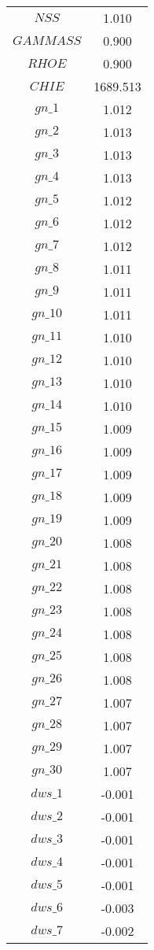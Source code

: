 \begin{center}
\begin{longtable}{cc}
$NSS$ 	 & 	 1.010 \\
$GAMMASS$ 	 & 	 0.900 \\
$RHOE$ 	 & 	 0.900 \\
$CHIE$ 	 & 	 1689.513 \\
$gn\_1$ 	 & 	 1.012 \\
$gn\_2$ 	 & 	 1.013 \\
$gn\_3$ 	 & 	 1.013 \\
$gn\_4$ 	 & 	 1.013 \\
$gn\_5$ 	 & 	 1.012 \\
$gn\_6$ 	 & 	 1.012 \\
$gn\_7$ 	 & 	 1.012 \\
$gn\_8$ 	 & 	 1.011 \\
$gn\_9$ 	 & 	 1.011 \\
$gn\_10$ 	 & 	 1.011 \\
$gn\_11$ 	 & 	 1.010 \\
$gn\_12$ 	 & 	 1.010 \\
$gn\_13$ 	 & 	 1.010 \\
$gn\_14$ 	 & 	 1.010 \\
$gn\_15$ 	 & 	 1.009 \\
$gn\_16$ 	 & 	 1.009 \\
$gn\_17$ 	 & 	 1.009 \\
$gn\_18$ 	 & 	 1.009 \\
$gn\_19$ 	 & 	 1.009 \\
$gn\_20$ 	 & 	 1.008 \\
$gn\_21$ 	 & 	 1.008 \\
$gn\_22$ 	 & 	 1.008 \\
$gn\_23$ 	 & 	 1.008 \\
$gn\_24$ 	 & 	 1.008 \\
$gn\_25$ 	 & 	 1.008 \\
$gn\_26$ 	 & 	 1.008 \\
$gn\_27$ 	 & 	 1.007 \\
$gn\_28$ 	 & 	 1.007 \\
$gn\_29$ 	 & 	 1.007 \\
$gn\_30$ 	 & 	 1.007 \\
$dws\_1$ 	 & 	 -0.001 \\
$dws\_2$ 	 & 	 -0.001 \\
$dws\_3$ 	 & 	 -0.001 \\
$dws\_4$ 	 & 	 -0.001 \\
$dws\_5$ 	 & 	 -0.001 \\
$dws\_6$ 	 & 	 -0.003 \\
$dws\_7$ 	 & 	 -0.002 \\

\end{longtable}
\end{center}
